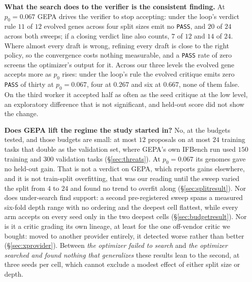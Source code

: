 \documentclass[11pt]{article}
\begin{document}
\textbf{What the search does to the verifier is the consistent finding.} At $p_0 = 0.067$ GEPA drives
the verifier to stop accepting: under the loop's verdict rule $11$ of $12$ evolved genes across
four split sizes emit no \texttt{PASS}, and $20$ of $24$ across both sweeps; if a closing verdict
line also counts, $7$ of $12$ and $14$ of $24$. Where almost every draft is wrong, refining every
draft is close to the right policy, so the convergence costs nothing measurable, and a
\texttt{PASS} rate of zero screens the optimizer's output for it. Across our three levels the
evolved gene accepts more as $p_0$ rises: under the loop's rule the evolved critique emits zero \texttt{PASS} of thirty at
$p_0 = 0.067$, four at $0.267$ and six at $0.667$, none of them false. On
the third worker it accepted half as often as the seed critique at the low level, an exploratory
difference that is not significant, and held-out score did not show the change.

\textbf{Does GEPA lift the regime the study started in?} No, at the budgets tested, and those
budgets are small: at most $12$ proposals on at most $24$ training tasks that double as the
validation set, where GEPA's own IFBench run used $150$ training and $300$ validation tasks
(\S\ref{sec:threats}). At $p_0 = 0.067$ its genomes gave no held-out gain. That is
not a verdict on GEPA, which reports gains elsewhere, and it is not train-split overfitting,
that was our reading until the sweep varied the split from $4$ to $24$ and found no trend to
overfit along (\S\ref{sec:splitresult}). Nor does under-search find support: a second
pre-registered sweep spans a measured six-fold depth range with no ordering and the deepest cell
flattest, while every arm accepts on every seed only in the two deepest cells
(\S\ref{sec:budgetresult}). Nor is it a critic grading its own lineage, at least for the one
off-vendor critic we bought: moved to another provider entirely, it detected worse rather than
better (\S\ref{sec:xprovider}). Between \emph{the optimizer failed to search} and \emph{the
optimizer searched and found nothing that generalizes} these results lean to the second, at
three seeds per cell, which cannot exclude a modest effect of either split size or depth.
\end{document}
